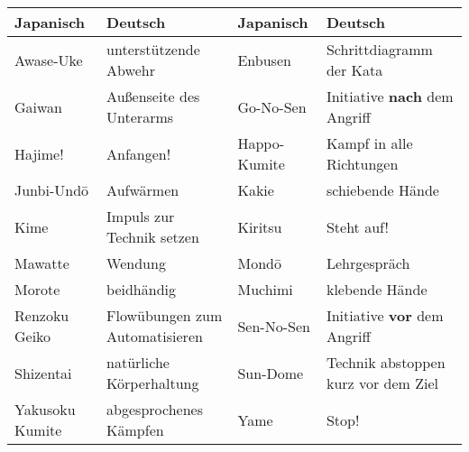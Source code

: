 	\begin{tabularx}{\linewidth}{lXlX}
	Japanisch	& Deutsch	& Japanisch&Deutsch\\
	\midrule
	Awase-Uke&	unterstützende Abwehr	&	Enbusen	&	Schrittdiagramm der Kata\\
	Gaiwan	& Außenseite des Unterarms	&	Go-No-Sen	&	Initiative \textbf{nach} dem Angriff\\
	Hajime!&	Anfangen!	&	Happo-Kumite	& Kampf in alle Richtungen\\
	Junbi-Und\={o}	& Aufwärmen	&	Kakie	& schiebende Hände\\
	Kime	&	Impuls zur Technik setzen	& Kiritsu & Steht auf!\\
	Mawatte	& Wendung&	Mond\={o}& Lehrgespräch\\
	Morote	& beidhändig	& Muchimi & klebende Hände\\
	Renzoku Geiko	& Flowübungen zum Automatisieren & Sen-No-Sen & Initiative \textbf{vor} dem Angriff\\
	Shizentai	& natürliche Körperhaltung&Sun-Dome & Technik abstoppen  kurz vor dem Ziel\\
	Yakusoku Kumite & abgesprochenes Kämpfen & Yame	& Stop!\\
	\end{tabularx}